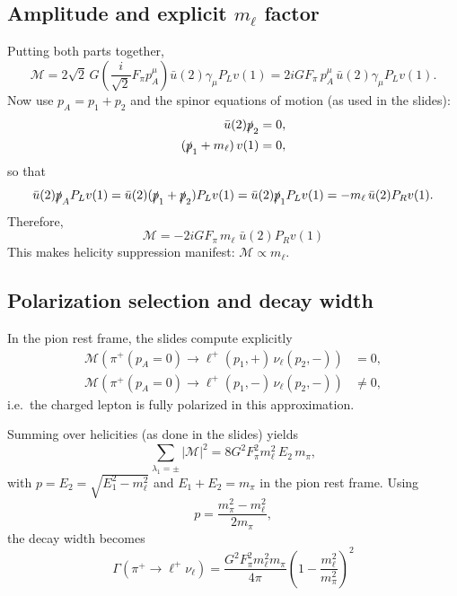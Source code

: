 \subsection{Amplitude and explicit $m_\ell$ factor}
Putting both parts together,
\begin{equation}
\mathcal{M}
=
2\sqrt{2}\,G\left(\frac{i}{\sqrt{2}}F_\pi p_A^\mu\right)\bar u(2)\gamma_\mu P_L v(1)
=
2iG F_\pi\,p_A^\mu\,\bar u(2)\gamma_\mu P_L v(1).
\end{equation}
Now use $p_A=p_1+p_2$ and the spinor equations of motion (as used in the slides):
\begin{align}
\bar u(2)\slashed{p}_2 &= 0,\\
(\slashed{p}_1 + m_\ell)\,v(1) &= 0,
\end{align}
so that
\begin{equation}
\bar u(2)\slashed{p}_A P_L v(1)
=
\bar u(2)(\slashed{p}_1+\slashed{p}_2)P_L v(1)
=
\bar u(2)\slashed{p}_1 P_L v(1)
=
- m_\ell\,\bar u(2)P_R v(1).
\end{equation}
Therefore,
\begin{equation}
\boxed{
\mathcal{M}=-2iG F_\pi\,m_\ell\;\bar u(2)P_R v(1)
}
\end{equation}
This makes helicity suppression manifest: $\mathcal{M}\propto m_\ell$.

\subsection{Polarization selection and decay width}
In the pion rest frame, the slides compute explicitly
\begin{align}
\mathcal{M}\!\left(\pi^+(p_A=0)\to \ell^+(p_1,+)\,\nu_\ell(p_2,-)\right) &= 0,\\
\mathcal{M}\!\left(\pi^+(p_A=0)\to \ell^+(p_1,-)\,\nu_\ell(p_2,-)\right) &\neq 0,
\end{align}
i.e.\ the charged lepton is fully polarized in this approximation.

Summing over helicities (as done in the slides) yields
\begin{equation}
\sum_{\lambda_1=\pm}|\mathcal{M}|^2
=
8G^2F_\pi^2 m_\ell^2\,E_2\,m_\pi,
\end{equation}
with $p=E_2=\sqrt{E_1^2-m_\ell^2}$ and $E_1+E_2=m_\pi$ in the pion rest frame.
Using
\begin{equation}
p=\frac{m_\pi^2-m_\ell^2}{2m_\pi},
\end{equation}
the decay width becomes
\begin{equation}
\boxed{
\Gamma(\pi^+\to \ell^+\nu_\ell)
=
\frac{G^2F_\pi^2 m_\ell^2 m_\pi}{4\pi}
\left(1-\frac{m_\ell^2}{m_\pi^2}\right)^2
}
\end{equation}

